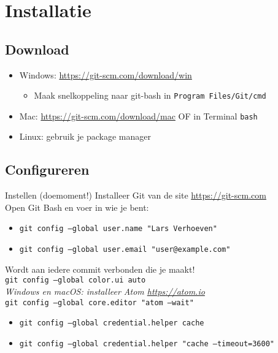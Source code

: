 \section[Get git]{Installatie}

\subsection{Download}
\begin{frame}
	\begin{itemize}
		\item Windows: \url{https://git-scm.com/download/win}
			\begin{itemize}
				\item \small{Maak snelkoppeling naar git-bash in \tt{Program Files/Git/cmd}}
			\end{itemize}
		\item Mac: \url{https://git-scm.com/download/mac} OF in Terminal
			\texttt{bash}
		\item Linux: gebruik je package manager
	\end{itemize}
\end{frame}

\subsection{Configureren}
\begin{frame}{Instellen (doemoment!)}
	Installeer Git van de site \url{https://git-scm.com}\\

	Open Git Bash en voer in wie je bent:
	\begin{itemize}
		\item \tt{git config --global user.name "Lars Verhoeven"}
		\item \tt{git config --global user.email "user@example.com"}
	\end{itemize}
	{\small\alert{Wordt aan iedere commit verbonden die je maakt!}}\\

	\texttt{git config --global color.ui auto}\\
	\emph{Windows en macOS: installeer Atom \url{https://atom.io}}\\
	\texttt{git config --global core.editor "atom --wait"}\\


	\begin{itemize}
		\item \tt{git config --global credential.helper cache}
		\item \tt{git config --global credential.helper "cache --timeout=3600"}
	\end{itemize}
\end{frame}
